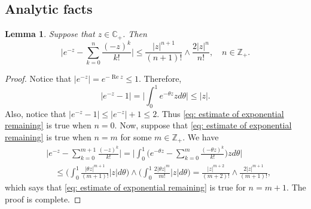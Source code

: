 \documentclass[12pt,a4paper]{amsart}
\theoremstyle{plain}
\newtheorem{lem}[thm]{Lemma}
\theoremstyle{definition}
\numberwithin{equation}{section}
\begin{document}
\subsection{Analytic facts}
\begin{lem}
\label{lem: estimate of exponential remaining}
    Suppose that $z\in \mathbb C_+$. Then
\begin{equation}
\label{eq: estimate of exponential remaining}
    \Big|e^{-z} - \sum_{k=0}^n \frac{(-z)^k}{k!} \Big|
    \leq \frac{|z|^{n+1}}{(n+1)!} \wedge \frac{2|z|^{n}}{n!}, \quad n\in \mathbb Z_+.
\end{equation}
\end{lem}
\begin{proof}
    Notice that $|e^{-z}| = e^{- \operatorname{Re} z} \leq 1$.
    Therefore,
\begin{equation}
    |e^{-z} - 1| = \Big| \int_0^1 e^{-\theta z} z d\theta\Big|
    \leq |z|.
\end{equation}
    Also, notice that $|e^{-z} - 1| \leq |e^{-z}|+1 \leq 2$.
    Thus \eqref{eq: estimate of exponential remaining} is true when $n = 0$.
    Now, suppose that \eqref{eq: estimate of exponential remaining} is true when $n = m$ for some $m \in \mathbb Z_+$.
    We have
\begin{equation}\begin{split}
    &\Big|e^{-z} - \sum_{k=0}^{m+1} \frac{(-z)^k}{k!}\Big|
    = \Big| \int_0^1\Big(e^{-\theta z} - \sum_{k=0}^m \frac{(-\theta z)^k}{k!} \Big) z d\theta \Big|
    \\&\quad \leq  \Big(\int_0^1 \frac{|\theta z|^{m+1}}{(m+1)!} |z| d\theta\Big) \wedge \Big(\int_0^1 \frac{2|\theta z|^{m}}{m!} |z| d\theta\Big)
    = \frac{|z|^{m+2}}{(m+2)!} \wedge \frac{2|z|^{m+1}}{(m+1)!},
\end{split}\end{equation}
    which says that \eqref{eq: estimate of exponential remaining} is true for $n = m + 1$.
    The proof is complete.
\end{proof}
\end{document}

